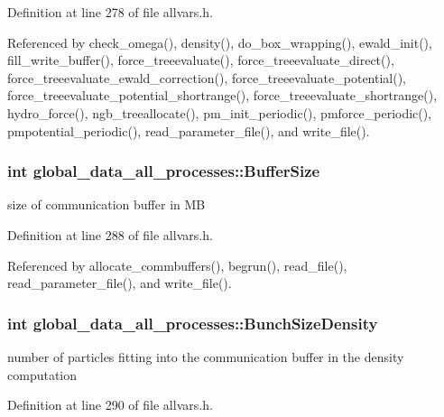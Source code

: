 Definition at line 278 of file allvars.h.



Referenced by check\_\-omega(), density(), do\_\-box\_\-wrapping(), ewald\_\-init(), fill\_\-write\_\-buffer(), force\_\-treeevaluate(), force\_\-treeevaluate\_\-direct(), force\_\-treeevaluate\_\-ewald\_\-correction(), force\_\-treeevaluate\_\-potential(), force\_\-treeevaluate\_\-potential\_\-shortrange(), force\_\-treeevaluate\_\-shortrange(), hydro\_\-force(), ngb\_\-treeallocate(), pm\_\-init\_\-periodic(), pmforce\_\-periodic(), pmpotential\_\-periodic(), read\_\-parameter\_\-file(), and write\_\-file().

\hypertarget{structglobal__data__all__processes_abd0120516eb7fee5a534464546fc5c7f}{
\subsubsection[{BufferSize}]{\setlength{\rightskip}{0pt plus 5cm}int {\bf global\_\-data\_\-all\_\-processes::BufferSize}}}
\label{structglobal__data__all__processes_abd0120516eb7fee5a534464546fc5c7f}
size of communication buffer in MB 

Definition at line 288 of file allvars.h.



Referenced by allocate\_\-commbuffers(), begrun(), read\_\-file(), read\_\-parameter\_\-file(), and write\_\-file().

\hypertarget{structglobal__data__all__processes_a9ab84bfa2f66ade551d613aeb3921d76}{
\subsubsection[{BunchSizeDensity}]{\setlength{\rightskip}{0pt plus 5cm}int {\bf global\_\-data\_\-all\_\-processes::BunchSizeDensity}}}
\label{structglobal__data__all__processes_a9ab84bfa2f66ade551d613aeb3921d76}
number of particles fitting into the communication buffer in the density computation 

Definition at line 290 of file allvars.h.



